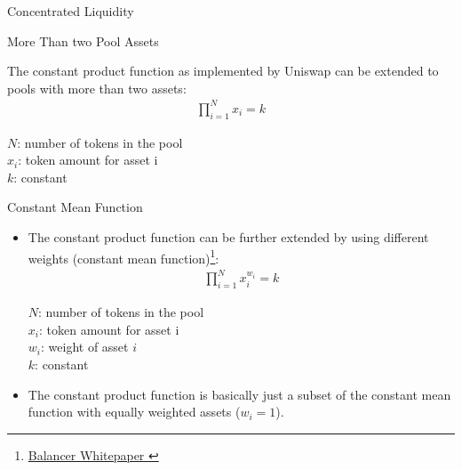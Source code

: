 \documentclass[]{beamer}
\begin{document}
\begin{frame}{Concentrated Liquidity}
	\begin{figure}[h!]
		\begin{center}
			
		\end{center}
	\end{figure}	
\end{frame}


\begin{frame}{More Than two Pool Assets}

The constant product function as implemented by Uniswap can be extended to pools with more than two assets:
		\begin{align*}
			\prod_{i=1}^N x_i= k
		\end{align*}
		
$N$: number of tokens in the pool\\
$x_i$: token amount for asset i\\
$k$: constant

\end{frame}


\begin{frame}{Constant Mean Function}
\begin{itemize}
	\item The constant product function can be further extended by using different weights (constant mean function)\footnote{\href{https://balancer.fi/whitepaper.pdf}{Balancer Whitepaper \link}}:
		\begin{align*}
			\prod_{i=1}^N x_i^{w_i}= k
		\end{align*}

		$N$: number of tokens in the pool\\
		$x_i$: token amount for asset i\\
		$w_i$: weight of asset $i$\\
		$k$: constant
		\vspace{0.5cm}
	\item The constant product function is basically just a subset of the constant mean function with equally weighted assets ($w_i = 1$).
\end{itemize}

\end{frame}
\end{document}
